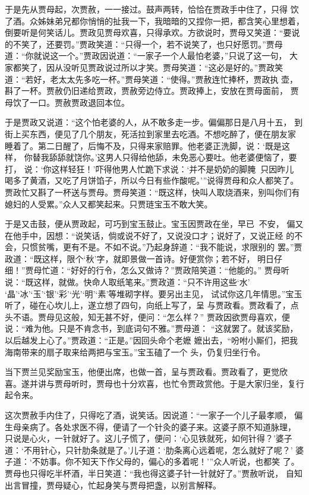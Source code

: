 于是先从贾母起，次贾赦，一一接过。鼓声两转，恰恰在贾政手中住了，只得
饮了酒。众姊妹弟兄都你悄悄的扯我一下，我暗暗的又捏你一把，都含笑心里想着，
倒要听是何笑话儿。贾政见贾母欢喜，只得承欢。方欲说时，贾母又笑道：“要说
的不笑了，还要罚。”贾政笑道：“只得一个，若不说笑了，也只好愿罚。”贾母
道：“你就说这一个。”贾政因说道：“一家子一个人最怕老婆，”只说了这一句，
大家都笑了，因从没听见贾政说过所以才笑。贾母笑道：“这必是好的。”贾政笑
道：“若好，老太太先多吃一杯。”贾母笑道：“使得。”贾赦连忙捧杯，贾政执
壶，斟了一杯。贾赦仍旧递给贾政，贾赦旁边侍立。贾政捧上，安放在贾母面前，
贾母饮了一口。贾赦贾政退回本位。

于是贾政又说道：“这个怕老婆的人，从不敢多走一步。偏偏那日是八月十五，
到街上买东西，便见了几个朋友，死活拉到家里去吃酒。不想吃醉了，便在朋友家
睡着了。第二日醒了，后悔不及，只得来家赔罪。他老婆正洗脚，说：‘既是这样，
你替我舔舔就饶你。’这男人只得给他舔，未免恶心要吐。他老婆便恼了，要打，
说：‘你这样轻狂！’吓得他男人忙跪下求说：‘并不是奶奶的脚腌，只因昨儿
喝多了黄酒，又吃了月饼馅子，所以今日有些作酸呢。’”说得贾母和众人都笑了。
贾政忙又斟了一杯送与贾母。贾母笑道：“既这样，快叫人取烧酒来，别叫你们有
媳妇的人受累。”众人又都笑起来。只贾琏宝玉不敢大笑。

于是又击鼓，便从贾政起，可巧到宝玉鼓止。宝玉因贾政在坐，早已不安，
偏又在他手中，因想：“说笑话，倘或说不好了，又说没口才；说好了，又说正经
的不会，只惯贫嘴，更有不是。不如不说。”乃起身辞道：“我不能说，求限别的
罢。”贾政道：“既这样，限个‘秋’字，就即景做一首诗。好便赏你；若不好，
明日仔细！”贾母忙道：“好好的行令，怎么又做诗？”贾政陪笑道：“他能的。”
贾母听说：“既这样，就做。快命人取纸笔来。”贾政道：“只不许用这些‘水’
‘晶’‘冰’‘玉’‘银’‘彩’‘光’‘明’‘素’等堆砌字样。要另出主见，
试试你这几年情思。”宝玉听了，碰在心坎儿上，遂立想了四句，向纸上写了，呈
与贾政看。贾政看了，点头不语。贾母见这般，知无甚不好，便问：“怎么样？”
贾政因欲贾母喜欢，便说：“难为他。只是不肯念书，到底词句不雅。”贾母道：
“这就罢了。就该奖励，以后越发上心了。”贾政道：“正是。”因回头命个老嬷
嬷出去，“吩咐小厮们，把我海南带来的扇子取来给两把与宝玉。”宝玉磕了一个
头，仍复归坐行令。

当下贾兰见奖励宝玉，他便出席，也做一首，呈与贾政看。贾政看了，更觉欣
喜。遂并讲与贾母听时，贾母也十分欢喜，也忙令贾政赏他。于是大家归坐，复行
起令来。

这次贾赦手内住了，只得吃了酒，说笑话。因说道：“一家子一个儿子最孝顺，
偏生母亲病了。各处求医不得，便请了一个针灸的婆子来。这婆子原不知道脉理，
只说是心火，一针就好了。这儿子慌了，便问：‘心见铁就死，如何针得？’婆子
道：‘不用针心，只针肋条就是了。’儿子道：‘肋条离心远着呢，怎么就好了呢？’
婆子道：‘不妨事。你不知天下作父母的，偏心的多着呢！’”众人听说，也都笑
了。贾母也只得吃半杯酒，半日笑道：“我也得这婆子针一针就好了。”贾赦听说，
自知出言冒撞，贾母疑心，忙起身笑与贾母把盏，以别言解释。

